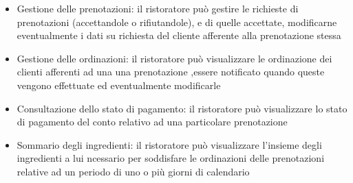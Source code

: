 \begin{itemize}
    \item Gestione delle prenotazioni: il ristoratore può gestire le richieste di prenotazioni (accettandole o rifiutandole), e 
    di quelle accettate, modificarne eventualmente i dati su richiesta del cliente afferente alla prenotazione stessa
    \item Gestione delle ordinazioni: il ristoratore può visualizzare le ordinazione dei clienti afferenti ad una
    una prenotazione ,essere notificato quando queste vengono effettuate ed eventualmente modificarle 
    \item Consultazione dello stato di pagamento: il ristoratore può visualizzare lo stato di pagamento del conto relativo ad una
    particolare prenotazione
    \item Sommario degli ingredienti: il ristoratore può visualizzare l'insieme degli ingredienti a lui ncessario per soddisfare 
    le ordinazioni delle prenotazioni  relative ad un periodo di uno o più giorni di calendario
\end{itemize}